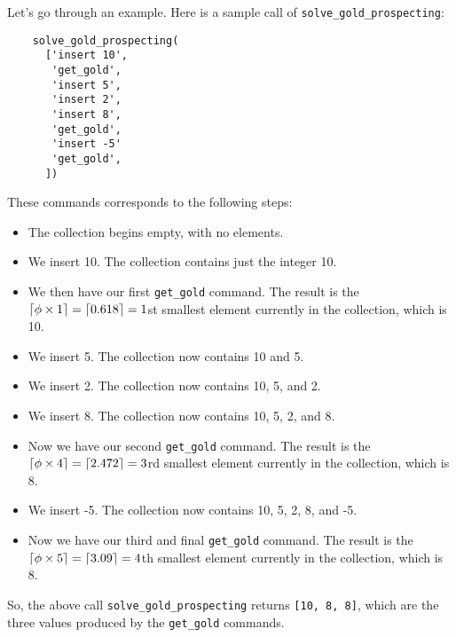 \documentclass{assignment-263}
\begin{document}
\begin{enumerate}
    Let's go through an example. Here is a sample call of \verb|solve_gold_prospecting|:
    \begin{verbatim}
    solve_gold_prospecting(
      ['insert 10',
       'get_gold',
       'insert 5',
       'insert 2',
       'insert 8',
       'get_gold',
       'insert -5'
       'get_gold',
      ])
    \end{verbatim}
    These commands corresponds to the following steps:
    \begin{itemize}
    \item The collection begins empty, with no elements.
    \item We insert 10. The collection contains just the integer 10.
    \item We then have our first \verb|get_gold| command. The result is the $\left \lceil \phi\times 1 \right \rceil = \left \lceil 0.618 \right \rceil = 1$st
          smallest element currently in the collection, which is 10.
    \item We insert 5. The collection now contains 10 and 5.
    \item We insert 2. The collection now contains 10, 5, and 2.
    \item We insert 8. The collection now contains 10, 5, 2, and 8.
    \item Now we have our second \verb|get_gold| command. The result is the $\left \lceil \phi\times 4 \right \rceil  = \left \lceil 2.472 \right \rceil = 3$rd
          smallest element currently in the collection, which is 8.
    \item We insert -5. The collection now contains 10, 5, 2, 8, and -5.
    \item Now we have our third and final \verb|get_gold| command. The result is the $\left \lceil \phi\times 5 \right \rceil = \left \lceil 3.09 \right \rceil = 4$th
          smallest element currently in the collection, which is 8.
    \end{itemize}

    So, the above call \verb|solve_gold_prospecting| returns \verb|[10, 8, 8]|, which
    are the three values produced by the \verb|get_gold| commands.
  

\end{enumerate}
\end{document}
